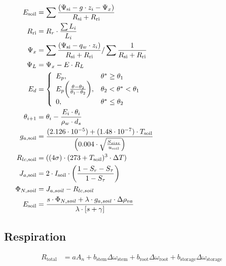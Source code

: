 \documentclass[10pt]{article}
\renewcommand{\marginnote}[2][]{}
\begin{document}
\begin{align}
 E_{\text{soil}} &= \sum \frac{(\Psi_{\text{si}} - g \cdot z_i - \Psi_x)}{R_{\text{si}}+R_{\text{ri}}} \label{eqn:Esoil} \\
 R_{\text{ri}} &= R_{r} \cdot \frac{\sum L_i}{L_i} \label{eqn:Rri} \\
 \Psi_x &= \sum \frac{(\Psi_{\text{si}}-q_w \cdot z_i)}{R_{\text{si}}+R_{\text{ri}}} / \sum \frac{1}{R_{\text{si}}+R_{\text{ri}}} \label{eqn:Psix} \\
 \Psi_L &= \Psi_x  - E \cdot R_L \hspace{3.2in} \label{eqn:PsiL}\\
 E_d &= \left\{ \begin{array}{ll}
        E_p , & \theta^{*} \geq \theta_1 \\
        E_p\biggl( \frac{\theta-\theta_2}{\theta_1 - \theta_2} \biggr), & \theta_2<\theta^*<\theta_1 \\
         0, & \theta^{*} \leq \theta_2 
                \end{array} \right. \label{eqn:Ed}\\
 \theta_{i+1} &= \theta_i - \frac{E_i \cdot \theta_i}{\rho_w \cdot d_s} \label{eqn:theta}\\
 g_{a,\text{soil}} &= \frac{(2.126 \cdot 10^{-5})+(1.48 \cdot 10^{-7}) \cdot T_{\text{soil}}}{\left(0.004 \cdot \sqrt{\frac{S_{size}}{u_{\text{soil}}}} \right)} \label{eqn:gasoil} \\
 R_{lc,\text{soil}} &= ((4 \sigma)\cdot(273 + T_{\text{soil}})^3 \cdot \Delta T) \label{eqn:Rlcsoil} \\
 J_{a,\text{soil}} &= 2 \cdot I_{\text{soil}} \cdot \biggl(\frac{1-S_r-S_{\tau}}{1-S_{\tau}}\biggr) \label{eqn:Jasoil} \\
 \Phi_{N,soil} &= J_{a,soil} - R_{lc,soil} \label{eqn:PhiNsoil} \\
 E_\text{soil} &= \frac{s \cdot \Phi_{N,soil} + \lambda \cdot g_{a,soil} \cdot \Delta \rho_{va}}{\lambda \cdot [s+\gamma]} \label{eqn:E2} \marginnote{is ``soil'' subscript correct?}
\end{align}

\subsection*{Respiration}
\begin{align}
  R_{\text{total}} &= a A_n + b_{\text{stem}}\Delta\omega_{\text{stem}} + b_{\text{root}}\Delta \omega_{\text{root}} + b_\text{storage}\Delta \omega_\text{storage} \label{eqn:Rtotal} 
\end{align}
\end{document}
